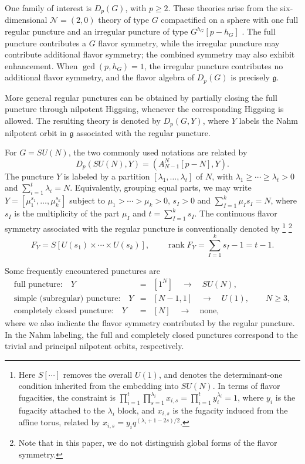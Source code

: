 \documentclass[a4paper,11pt]{article}
\theoremstyle{definition}
\theoremstyle{definition}
\theoremstyle{remark}
\newcommand{\be}{\begin{equation}}
\newcommand{\ee}{\end{equation}}
\newcommand{\beqn}{\begin{eqnarray}}
\newcommand{\eeqn}{\end{eqnarray}}
\begin{document}
One family of interest is $D_p(G)$, with $p\ge2$. These theories arise from the six-dimensional $\mathcal N=(2,0)$ theory of type $G$ compactified on a sphere with one full regular puncture and an irregular puncture of type $G^{h_G}[p-h_G]$ \cite{Xie:2012hs}. The full puncture contributes a $G$ flavor symmetry, while the irregular puncture may contribute additional flavor symmetry; the combined symmetry may also exhibit enhancement. When $\gcd(p,h_G)=1$, the irregular puncture contributes no additional flavor symmetry, and the flavor algebra of $D_p(G)$ is precisely $\mathfrak g$.

More general regular punctures can be obtained by partially closing the full puncture through nilpotent Higgsing, whenever the corresponding Higgsing is allowed. The resulting theory is denoted by $D_p(G,Y)$, where $Y$ labels the Nahm nilpotent orbit in $\mathfrak g$ associated with the regular puncture.  


For $G=SU(N)$, the two commonly used notations are related by
\be
D_p(SU(N),Y)=\left(A_{N-1}^{N}[p-N],Y\right).
\ee
The puncture $Y$ is labeled by a partition $[\lambda_1,\ldots,\lambda_t]$ of $N$, with $\lambda_1\ge\cdots\ge\lambda_t>0$ and $\sum_{i=1}^t\lambda_i=N$. Equivalently, grouping equal parts, we may write
$ Y=[\mu_1^{s_1},\ldots,\mu_k^{s_k}]$ subject to   $\mu_1>\cdots>\mu_k>0$, $  s_I>0$ and $\sum_{I=1}^k\mu_I s_I=N$, where $s_I$ is the multiplicity of the part $\mu_I$ and $t=\sum_{I=1}^k s_I$. The continuous flavor symmetry associated with the regular puncture is conventionally denoted  by \footnote{Here $S[\cdots]$ removes the overall $U(1)$, and  denotes the determinant-one condition inherited from the embedding into $SU(N)$. In terms of flavor fugacities, the constraint is $\prod_{i=1}^t\prod_{s=1}^{\lambda_i}x_{i,s}= \prod_{i=1}^t y_i^{\lambda_i}=1$,
where $y_i$ is the   fugacity attached to the $\lambda_i$ block, and  $x_{i,s}$  is the  fugacity      induced from the affine torus, related by 
$ x_{i,s} =y_iq^{(\lambda_i+1-2s)/2} $.
} \footnote{Note that in this paper, we do not distinguish global forms of the flavor symmetry. 
}
\be
F_Y=S\!\left[U(s_1)\times\cdots\times U(s_k)\right],
\qquad
\operatorname{rank}F_Y=\sum_{I=1}^k s_I-1=t-1.
\ee
  
 
 
Some frequently encountered punctures are
\beqn
\text{full puncture:}\quad Y
&=&[1^N]
\quad\longrightarrow\quad SU(N),
\\
\text{simple (subregular) puncture:}\quad Y
&=&[N-1,1]
\quad\longrightarrow\quad U(1),
\qquad N\ge3,
\\
\text{completely closed puncture:}\quad Y
&=&[N]
\quad\longrightarrow\quad \text{none},
\eeqn
where we also indicate the  flavor symmetry contributed by the regular puncture. In the Nahm labeling, the full and completely closed punctures correspond to the trivial and principal nilpotent orbits, respectively.
\end{document}
